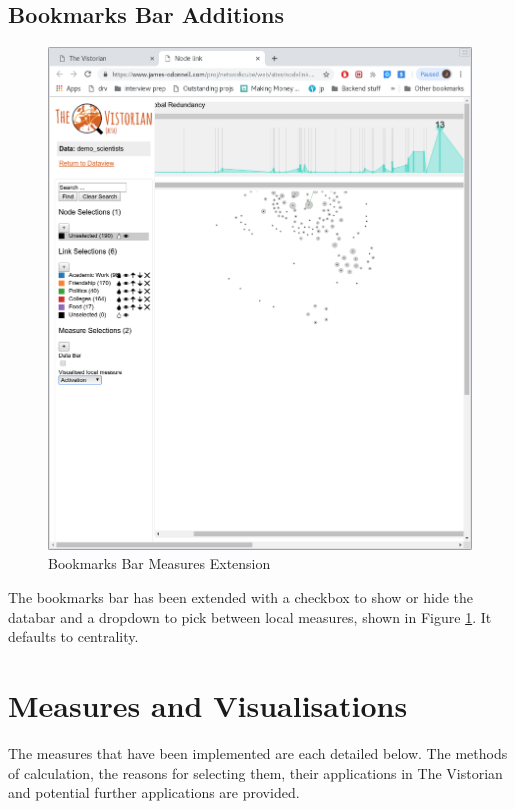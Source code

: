\subsection{Bookmarks Bar Additions}
\begin{figure}
  \begin{center}
  \includegraphics[trim={0, 12cm, 20cm, 22cm},clip, width=140mm]{./Figures/bookmarksbar.png}
  \caption{Bookmarks Bar Measures Extension}
  \label{fig:bookmarksbar}
  \end{center}
\end{figure}

The bookmarks bar has been extended with a checkbox to show or hide the databar and a dropdown to pick between local measures, shown in Figure \ref{fig:bookmarksbar}. It defaults to centrality.






\section{Measures and Visualisations}
The measures that have been implemented are each detailed below. The methods of calculation, the reasons for selecting them, their applications in The Vistorian and potential further applications are provided.

